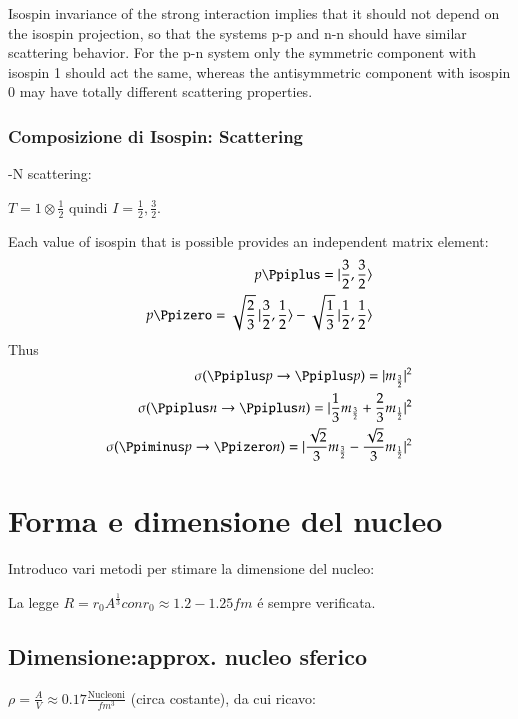 \documentclass[main.tex]{subfiles}
\begin{document}
Isospin invariance of the strong interaction implies that it should not depend on the isospin projection, so that the systems p-p and n-n should have similar scattering behavior. For the p-n system only the symmetric component with isospin 1 should act the same, whereas the antisymmetric component with isospin 0 may have totally different scattering properties.


\subsection{Composizione di Isospin: Scattering}
\begin{itemize*}
\item \Ppi-N scattering:

$T=1\otimes\frac{1}{2}$ quindi $I=\frac{1}{2},\frac{3}{2}$.

Each value of isospin that is possible provides an independent matrix element:
\begin{align*}
p\Ppiplus=\ket{\frac{3}{2},\frac{3}{2}}\\
p\Ppizero=\sqrt{\frac{2}{3}}\ket{\frac{3}{2},\frac{1}{2}}-\sqrt{\frac{1}{3}}\ket{\frac{1}{2},\frac{1}{2}}
\end{align*}
Thus 
\begin{align*}
\sigma(\Ppiplus p\rightarrow\Ppiplus p)=|m_{\frac{3}{2}}|^2\\
\sigma(\Ppiplus n\rightarrow\Ppiplus n)=|\frac{1}{3}m_{\frac{3}{2}}+\frac{2}{3}m_{\frac{1}{2}}|^2\\
\sigma(\Ppiminus p\rightarrow\Ppizero n)=|\frac{\sqrt{2}}{3}m_{\frac{3}{2}}-\frac{\sqrt{2}}{3}m_{\frac{1}{2}}|^2
\end{align*}

\end{itemize*}
 
 \chapter{Forma e dimensione del nucleo}
 
Introduco vari metodi per stimare la dimensione del nucleo:

La legge $R=r_0A^{\frac{1}{3}} con r_0\approx1.2-1.25 fm$ \'e sempre verificata.

\section{Dimensione:approx. nucleo sferico}
$\rho=\frac{A}{V}\approx0.17 \frac{\text{Nucleoni}}{fm^3}$ (circa costante), da cui ricavo:
\end{document}
